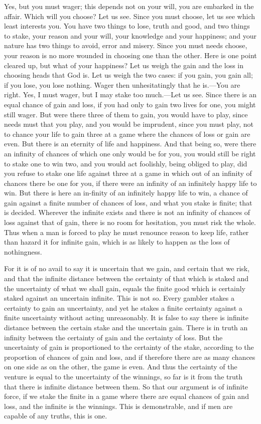 Yes, but you must wager; this depends not on your will, you are
embarked in the affair. Which will you choose? Let us see. Since you
must choose, let us see which least interests you. You have two things
to lose, truth and good, and two things to stake, your reason and your
will, your knowledge and your happiness; and your nature has two
things to avoid, error and misery. Since you must needs choose, your
reason is no more wounded in choosing one than the other. Here is one
point cleared up, but what of your happiness? Let us weigh the gain
and the loss in choosing heads that God is. Let us weigh the two
cases: if you gain, you gain all; if you lose, you lose nothing. Wager
then unhesitatingly that he is.---You are right. Yes, I must wager,
but I may stake too much.---Let us see. Since there is an equal chance
of gain and loss, if you had only to gain two lives for one, you might
still wager. But were there three of them to gain, you would have to
play, since needs must that you play, and you would be imprudent,
since you must play, not to chance your life to gain three at a game
where the chances of loss or gain are even. But there is an eternity
of life and happiness. And that being so, were there an infinity of
chances of which one only would be for you, you would still be right
to stake one to win two, and you would act foolishly, being obliged to
play, did you refuse to stake one life against three at a game in
which out of an infinity of chances there be one for you, if there
were an infinity of an infinitely happy life to win. But there is here
an in-finity of an infinitely happy life to win, a chance of
gain against a finite number of chances of loss, and what you stake is
finite; that is decided. Wherever the infinite exists and there is not
an infinity of chances of loss against that of gain, there is no room
for hesitation, you must risk the whole. Thus when a man is forced to
play he must renounce reason to keep life, rather than hazard it for
infinite gain, which is as likely to happen as the loss of
nothingness.

For it is of no avail to say it is uncertain that we gain, and certain
that we risk, and that the infinite distance between the certainty of
that which is staked and the uncertainty of what we shall gain, equals
the finite good which is certainly staked against an uncertain
infinite. This is not so. Every gambler stakes a certainty to gain an
uncertainty, and yet he stakes a finite certainty against a finite
uncertainty without acting unreasonably. It is false to say there is
infinite distance between the certain stake and the uncertain gain.
There is in truth an infinity between the certainty of gain and the
certainty of loss. But the uncertainty of gain is proportioned to the
certainty of the stake, according to the proportion of chances of gain
and loss, and if therefore there are as many chances on one side as on
the other, the game is even. And thus the certainty of the venture is
equal to the uncertainty of the winnings, so far is it from the truth
that there is infinite distance between them. So that our argument is
of infinite force, if we stake the finite in a game where there are
equal chances of gain and loss, and the infinite is the winnings. This
is demonstrable, and if men are capable of any truths, this is one.

